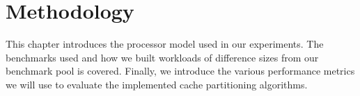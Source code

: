 
\chapter{Methodology}
\label{cpt:methodology}

This chapter introduces the processor model used in our experiments.
The benchmarks used and how we built workloads of difference sizes from our benchmark pool is covered.
Finally, we introduce the various performance metrics we will use to evaluate the implemented cache partitioning algorithms.






